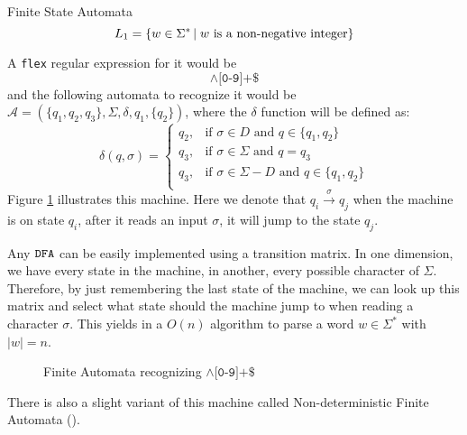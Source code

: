 \begin{section}{Finite State Automata}
$$ L_1 = \{w \in \Sigma^*\,|\;w \text{ is a non-negative integer}\}$$

A \texttt{flex} regular expression for it would be
$$\land\texttt{[0-9]+\$}$$
and the following automata to recognize it would be
$\mathcal{A} = (\{q_1, q_2, q_3\}, \Sigma, \delta, q_1, \{q_2\})$, where
the $\delta$ function will be defined as:
	\[
		\delta(q, \sigma) = \begin{cases}
		  q_2,& \text{if } \sigma \in D \text{ and } q \in \{q_1, q_2\} \\
		  q_3,& \text{if } \sigma \in \Sigma \text{ and } q = q_3 \\
		  q_3,& \text{if } \sigma \in \Sigma - D \text{ and } q \in \{q_1, q_2\} \\
		\end{cases} \nonumber
	\]
Figure \ref{fig:a_automata} illustrates this machine. Here we denote that
$q_i \overset{\sigma}{\longrightarrow} q_j$ when the machine is on state
$q_i$, after it reads an input $\sigma$, it will jump to the state $q_j$.

Any $\texttt{DFA}$ can be easily implemented using a transition
matrix. In one dimension, we have every state in the machine, in another,
every possible character of $\Sigma$.  Therefore, by just remembering the
last state of the machine, we can look up this matrix and select what state
should the machine jump to when reading a character $\sigma$. This
yields in a $O(n)$ algorithm to parse a word $w \in \Sigma^*$ with $|w| = n$.


\begin{figure}

\caption{Finite Automata recognizing $\land\texttt{[0-9]+\$}$}
\label{fig:a_automata}
\end{figure}

There is also a slight variant of this machine called Non-deterministic Finite Automata ().


\end{section}
